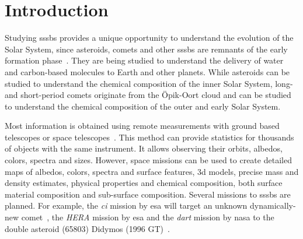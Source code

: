 \section{Introduction} \label{sec:introduction}




Studying \glspl{sssb} provides a unique opportunity to understand the evolution of the Solar System, since asteroids, comets and other \glspl{sssb} are remnants of the early formation phase~\cite{walsh2018rubble, a2017comets}. They are being studied to understand the delivery of water and carbon-based molecules to Earth and other planets. While asteroids can be studied to understand the chemical composition of the inner Solar System, long- and short-period comets originate from the \"Opik-Oort cloud and can be studied to understand the chemical composition of the outer and early Solar System.

Most information is obtained using remote measurements with ground based telescopes or space telescopes~\cite{bowles2018castaway}. This method can provide statistics for thousands of objects with the same instrument. It allows observing their orbits, albedos, colors, spectra and sizes. However, space missions can be used to create detailed maps of albedos, colors, spectra and surface features, \gls{3d} models, precise mass and density estimates, physical properties and chemical composition, both surface material composition and sub-surface composition. Several missions to \glspl{sssb} are planned. For example, the \textit{\gls{ci}} mission by \gls{esa} will target an unknown dynamically-new comet~\cite{snodgrass2019europeanCI}, the \textit{HERA} mission by \gls{esa} and the \textit{\gls{dart}} mission by \gls{nasa} to the double asteroid (65803) Didymos (1996 GT)~\cite{hera, talbert_2017DART}.

